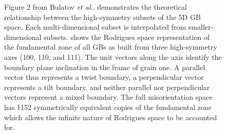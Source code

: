 \documentclass[12pt]{report}
\begin{document}
\begin{figure}[ht!]
 \centering
 \quad
 \caption{\label{fig:bulatovFig2}Figure 2 from Bulatov \emph{et al.}\cite{bulatov2014}. \protect{} demonstrates the theoretical relationship between the high-symmetry subsets of the 5D GB space.  Each multi-dimensional subset is interpolated from smaller-dimensional subsets. \protect{} shows the Rodrigues space representation of the fundamental zone of all GBs as built from three high-symmetry axes (\textlangle{}100\textrangle{}, \textlangle{}110\textrangle{}, and \textlangle{}111\textrangle{}).  The unit vectors along the axis identify the boundary plane inclination in the frame of grain one.  A parallel vector thus represents a twist boundary, a perpendicular vector represents a tilt boundary, and neither parallel nor perpendicular vectors represent a mixed boundary.  The full misorientation space has 1152 symmetrically equivalent copies of the fundamental zone\cite{bulatov2014, randle2000} which allows the infinite nature of Rodrigues space to be accounted for.}

\end{figure}
\end{document}
